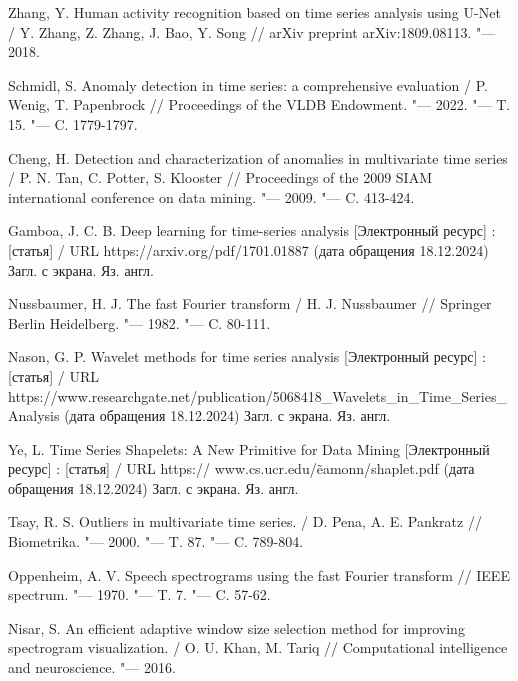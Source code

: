 \documentclass[spec, och, diploma]{SCWorks}
\begin{document}
\begin{thebibliography}{99}

     Zhang, Y. Human activity recognition based on time series
    analysis using U-Net / Y. Zhang, Z. Zhang, J. Bao, Y. Song // arXiv preprint
    arXiv:1809.08113. "--- 2018.

     Schmidl, S. Anomaly detection in time series: a
    comprehensive evaluation / P. Wenig, T. Papenbrock // Proceedings of the
    VLDB Endowment. "--- 2022. "--- T. 15. "--- C. 1779-1797.

     Cheng, H. Detection and characterization of
    anomalies in multivariate time series / P. N. Tan, C. Potter, S. Klooster //
    Proceedings of the 2009 SIAM international conference on data mining. "---
    2009. "--- C. 413-424.


     Gamboa, J. C. B. Deep learning for time-series analysis
    [Электронный ресурс] : [статья] / URL https://arxiv.org/pdf/1701.01887 (дата
    обращения 18.12.2024) Загл. с экрана. Яз. англ.

     Nussbaumer, H. J. The fast Fourier transform / H. J.
    Nussbaumer // Springer Berlin Heidelberg. "--- 1982. "--- C. 80-111.

     Nason, G. P. Wavelet methods for time series analysis
    [Электронный ресурс] : [статья] / URL
    https://www.researchgate.net/publication/5068418_Wavelets_in_Time_Series_Analysis
    (дата обращения 18.12.2024) Загл. с экрана. Яз. англ.

     Ye, L. Time Series Shapelets: A New Primitive for Data
    Mining [Электронный ресурс] : [статья] / URL https://
    www.cs.ucr.edu/\~eamonn/shaplet.pdf (дата обращения 18.12.2024) Загл. с
    экрана. Яз. англ.

     Tsay, R. S. Outliers in multivariate time series. / D.
    Pena, A. E. Pankratz // Biometrika. "--- 2000. "--- T. 87. "--- C. 789-804.

     Oppenheim, A. V. Speech spectrograms using the fast
    Fourier transform // IEEE spectrum. "--- 1970. "--- T. 7. "--- C. 57-62.

     Nisar, S. An efficient adaptive window size selection
    method for improving spectrogram visualization. / O. U. Khan, M. Tariq //
    Computational intelligence and neuroscience. "--- 2016.


\end{thebibliography}
\end{document}
